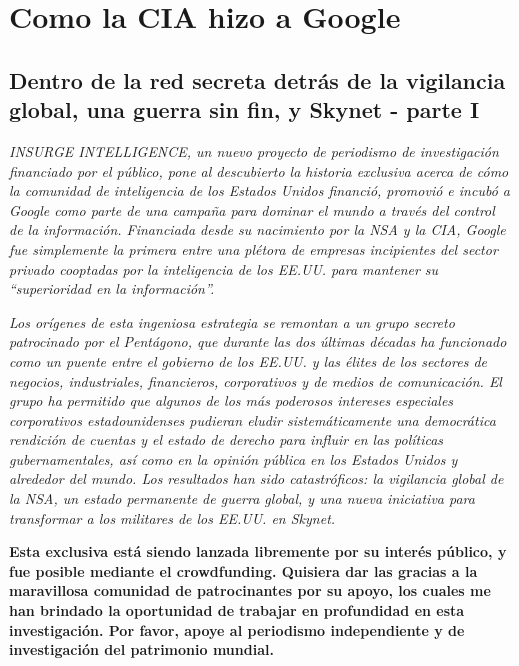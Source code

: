 \documentclass[10pt,a5paper,twoside,spanish,]{book}
\date{}
\begin{document}
{
\hypersetup{linkcolor=black}
\setcounter{tocdepth}{2}
\tableofcontents
}
\chapter{Como la CIA hizo a Google}\label{como-la-cia-hizo-a-google}

\section{Dentro de la red secreta detrás de la vigilancia global, una
guerra sin fin, y Skynet - parte
I}\label{dentro-de-la-red-secreta-detruxe1s-de-la-vigilancia-global-una-guerra-sin-fin-y-skynet---parte-i}

\emph{INSURGE INTELLIGENCE, un nuevo proyecto de periodismo de
investigación financiado por el público, pone al descubierto la historia
exclusiva acerca de cómo la comunidad de inteligencia de los Estados
Unidos financió, promovió e incubó a Google como parte de una campaña
para dominar el mundo a través del control de la información. Financiada
desde su nacimiento por la NSA y la CIA, Google fue simplemente la
primera entre una plétora de empresas incipientes del sector privado
cooptadas por la inteligencia de los EE.UU. para mantener su
``superioridad en la información''.}

\emph{Los orígenes de esta ingeniosa estrategia se remontan a un grupo
secreto patrocinado por el Pentágono, que durante las dos últimas
décadas ha funcionado como un puente entre el gobierno de los EE.UU. y
las élites de los sectores de negocios, industriales, financieros,
corporativos y de medios de comunicación. El grupo ha permitido que
algunos de los más poderosos intereses especiales corporativos
estadounidenses pudieran eludir sistemáticamente una democrática
rendición de cuentas y el estado de derecho para influir en las
políticas gubernamentales, así como en la opinión pública en los Estados
Unidos y alrededor del mundo. Los resultados han sido catastróficos: la
vigilancia global de la NSA, un estado permanente de guerra global, y
una nueva iniciativa para transformar a los militares de los EE.UU. en
Skynet.}

\textbf{Esta exclusiva está siendo lanzada libremente por su interés
público, y fue posible mediante el crowdfunding. Quisiera dar las
gracias a la maravillosa comunidad de patrocinantes por su apoyo, los
cuales me han brindado la oportunidad de trabajar en profundidad en esta
investigación. Por favor, apoye al periodismo independiente y de
investigación del patrimonio mundial.}
\end{document}
